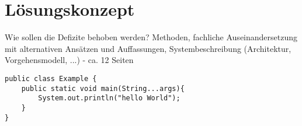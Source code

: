 \chapter{Lösungskonzept}
\thispagestyle{fancy}

Wie sollen die Defizite behoben werden? Methoden, fachliche Auseinandersetzung mit alternativen Ansätzen und Auffassungen, Systembeschreibung (Architektur, Vorgehensmodell, ...) - ca. 12 Seiten


\begin{lstlisting}
public class Example {
	public static void main(String...args){
		System.out.println("hello World");
	}
}
\end{lstlisting}

